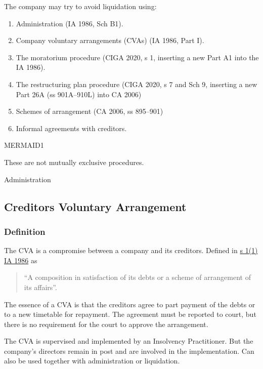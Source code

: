 \documentclass[
]{article}
\providecommand{\tightlist}{%
  \setlength{\itemsep}{0pt}\setlength{\parskip}{0pt}}
\begin{document}
The company may try to avoid liquidation using:

\begin{enumerate}
\tightlist
\item
  Administration (IA 1986, Sch B1).
\item
  Company voluntary arrangements (CVAs) (IA 1986, Part I).
\item
  The moratorium procedure (CIGA 2020, s 1, inserting a new Part A1 into
  the IA 1986).
\item
  The restructuring plan procedure (CIGA 2020, s 7 and Sch 9, inserting
  a new Part 26A (ss 901A--910L) into CA 2006)
\item
  Schemes of arrangement (CA 2006, ss 895--901)
\item
  Informal agreements with creditors.
\end{enumerate}

MERMAID1

These are not mutually exclusive procedures.

Administration

\hypertarget{creditors-voluntary-arrangement}{%
\subsection{Creditors Voluntary
Arrangement}\label{creditors-voluntary-arrangement}}

\hypertarget{definition}{%
\subsubsection{Definition}\label{definition}}

The CVA is a compromise between a company and its creditors. Defined in
\href{https://www.legislation.gov.uk/ukpga/1986/45/section/1}{s 1(1) IA
1986} as

\begin{quote}
``A composition in satisfaction of its debts or a scheme of arrangement
of its affairs''.
\end{quote}

The essence of a CVA is that the creditors agree to part payment of the
debts or to a new timetable for repayment. The agreement must be
reported to court, but there is no requirement for the court to approve
the arrangement.

The CVA is supervised and implemented by an Insolvency Practitioner. But
the company's directors remain in post and are involved in the
implementation. Can also be used together with administration or
liquidation.
\end{document}
